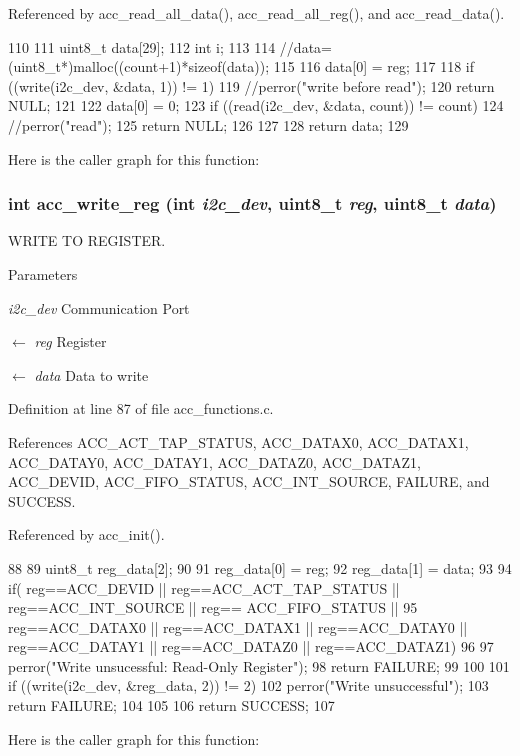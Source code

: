 Referenced by acc\_\-read\_\-all\_\-data(), acc\_\-read\_\-all\_\-reg(), and acc\_\-read\_\-data().




\begin{DoxyCode}
110 {
111   uint8_t data[29];
112   int i;
113 
114   //data=(uint8_t*)malloc((count+1)*sizeof(data));
115   
116   data[0] = reg;
117 
118   if ((write(i2c_dev, &data, 1)) != 1) {                 
119         //perror("write before read");
120         return NULL;
121   }
122   data[0] = 0;
123   if ((read(i2c_dev, &data, count)) != count) {
124         //perror("read");
125         return NULL;    
126   }
127 
128   return data;
129 }
\end{DoxyCode}




Here is the caller graph for this function:

\hypertarget{group__acc_ga534116416343122de29a5b6ade6876bd}{
\subsubsection[{acc\_\-write\_\-reg}]{\setlength{\rightskip}{0pt plus 5cm}int acc\_\-write\_\-reg (int {\em i2c\_\-dev}, \/  uint8\_\-t {\em reg}, \/  uint8\_\-t {\em data})}}
\label{group__acc_ga534116416343122de29a5b6ade6876bd}


WRITE TO REGISTER. 


\begin{DoxyParams}{Parameters}
\item[{\em i2c\_\-dev}]Communication Port \item[\mbox{$\leftarrow$} {\em reg}]Register \item[\mbox{$\leftarrow$} {\em data}]Data to write \end{DoxyParams}


Definition at line 87 of file acc\_\-functions.c.



References ACC\_\-ACT\_\-TAP\_\-STATUS, ACC\_\-DATAX0, ACC\_\-DATAX1, ACC\_\-DATAY0, ACC\_\-DATAY1, ACC\_\-DATAZ0, ACC\_\-DATAZ1, ACC\_\-DEVID, ACC\_\-FIFO\_\-STATUS, ACC\_\-INT\_\-SOURCE, FAILURE, and SUCCESS.



Referenced by acc\_\-init().




\begin{DoxyCode}
88 {
89   uint8_t reg_data[2];
90 
91   reg_data[0] = reg;
92   reg_data[1] = data;
93 
94   if( reg==ACC_DEVID || reg==ACC_ACT_TAP_STATUS || reg==ACC_INT_SOURCE || reg==
      ACC_FIFO_STATUS ||
95       reg==ACC_DATAX0 || reg==ACC_DATAX1 || reg==ACC_DATAY0 || reg==ACC_DATAY1 ||
       reg==ACC_DATAZ0 || reg==ACC_DATAZ1)
96   {
97       perror("Write unsucessful: Read-Only Register");
98       return FAILURE;
99   }
100         
101   if ((write(i2c_dev, &reg_data, 2)) != 2) {             
102           perror("Write unsuccessful");
103           return FAILURE;
104   }
105 
106   return SUCCESS;
107 }
\end{DoxyCode}




Here is the caller graph for this function:

